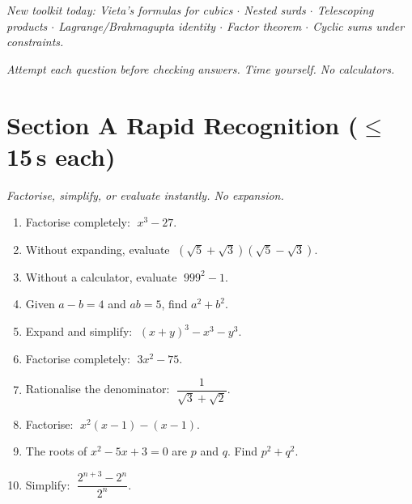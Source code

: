 \documentclass[11pt,a4paper]{article}
\begin{document}
\noindent\textit{New toolkit today: Vieta's formulas for cubics $\cdot$ Nested surds $\cdot$ Telescoping products $\cdot$ Lagrange/Brahmagupta identity $\cdot$ Factor theorem $\cdot$ Cyclic sums under constraints.}

\vspace{2pt}
\noindent\textit{Attempt each question before checking answers. Time yourself. No calculators.}

\section*{Section A \quad Rapid Recognition \hfill{\normalfont\small($\leq$15\,s each)}}

\noindent\textit{Factorise, simplify, or evaluate instantly. No expansion.}

\begin{enumerate}

\item Factorise completely: $\;x^3 - 27$.

\item Without expanding, evaluate $\;({\sqrt{5}+\sqrt{3}})({\sqrt{5}-\sqrt{3}})$.

\item Without a calculator, evaluate $\;999^2 - 1$.

\item Given $a - b = 4$ and $ab = 5$, find $a^2 + b^2$.

\item Expand and simplify: $\;(x+y)^3 - x^3 - y^3$.

\item Factorise completely: $\;3x^2 - 75$.

\item Rationalise the denominator: $\;\dfrac{1}{\sqrt{3}+\sqrt{2}}$.

\item Factorise: $\;x^2(x-1)-(x-1)$.

\item The roots of $x^2 - 5x + 3 = 0$ are $p$ and $q$. Find $p^2 + q^2$.

\item Simplify: $\;\dfrac{2^{n+3}-2^n}{2^n}$.

\end{enumerate}
\end{document}
